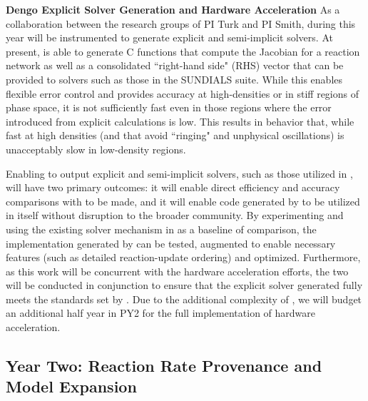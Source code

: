 \noindent \textbf{Dengo Explicit Solver Generation and Hardware Acceleration}
As a collaboration between the research groups of PI Turk and PI Smith, during
this year \dengo{} will be instrumented to generate explicit and semi-implicit
solvers.  At present, \dengo{} is able to generate C functions that compute the
Jacobian for a reaction network as well as a consolidated ``right-hand side"
(RHS)
vector that can be provided to solvers such as those in the SUNDIALS suite.
While this enables flexible error control and provides accuracy at
high-densities or in stiff regions of phase space, it is not sufficiently fast
even in those regions where the error introduced from explicit calculations is
low.  This results in behavior that, while fast at high densities (and that
avoid ``ringing" and unphysical oscillations) is unacceptably slow in
low-density regions.

Enabling \dengo{} to output explicit and semi-implicit solvers, such as those
utilized in \grackle{}, will have two primary outcomes: it will enable direct
efficiency and accuracy comparisons with \grackle{} to be made, and it will
enable code generated by \dengo{} to be utilized in \grackle{} itself without
disruption to the broader community.  By experimenting and using the
existing solver mechanism in \grackle{} as a baseline of comparison, the
implementation generated by \dengo{} can be tested, augmented to enable
necessary features (such as detailed reaction-update ordering) and optimized.
Furthermore, as this work will be concurrent with the \grackle{} hardware
acceleration efforts, the two will be conducted in conjunction to ensure that
the explicit solver generated fully meets the standards set by
\grackle{}. Due to the additional complexity of \dengo{}, we will
budget an additional half year in PY2 for the full implementation of
hardware acceleration.

\subsection{Year Two: Reaction Rate Provenance and Model Expansion}

